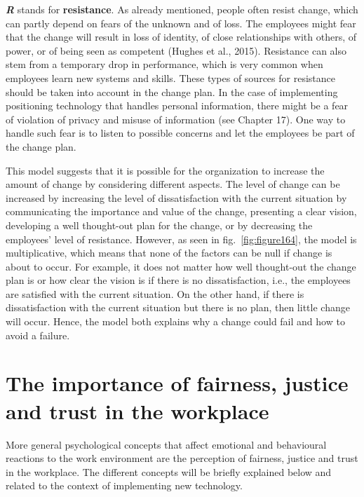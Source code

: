 \documentclass[
  12pt,
]{scrbook}
\begin{document}
\textbf{\emph{R}} stands for \textbf{resistance}. As already mentioned, people often resist change, which can partly depend on fears of the unknown and of loss. The employees might fear that the change will result in loss of identity, of close relationships with others, of power, or of being seen as competent (Hughes et al., 2015). Resistance can also stem from a temporary drop in performance, which is very common when employees learn new systems and skills. These types of sources for resistance should be taken into account in the change plan. In the case of implementing positioning technology that handles personal information, there might be a fear of violation of privacy and misuse of information (see Chapter 17). One way to handle such fear is to listen to possible concerns and let the employees be part of the change plan.

This model suggests that it is possible for the organization to increase the amount of change by considering different aspects. The level of change can be increased by increasing the level of dissatisfaction with the current situation by communicating the importance and value of the change, presenting a clear vision, developing a well thought-out plan for the change, or by decreasing the employees' level of resistance. However, as seen in fig.~\ref{fig:figure164}, the model is multiplicative, which means that none of the factors can be null if change is about to occur. For example, it does not matter how well thought-out the change plan is or how clear the vision is if there is no dissatisfaction, i.e., the employees are satisfied with the current situation. On the other hand, if there is dissatisfaction with the current situation but there is no plan, then little change will occur. Hence, the model both explains why a change could fail and how to avoid a failure.

\hypertarget{the-importance-of-fairness-justice-and-trust-in-the-workplace}{%
\section*{The importance of fairness, justice and trust in the workplace}\label{the-importance-of-fairness-justice-and-trust-in-the-workplace}}

More general psychological concepts that affect emotional and behavioural reactions to the work environment are the perception of fairness, justice and trust in the workplace. The different concepts will be briefly explained below and related to the context of implementing new technology.
\end{document}
